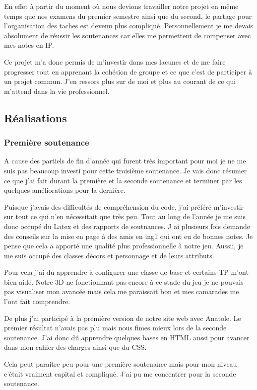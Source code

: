 \documentclass[12pt]{article}
\begin{document}
En effet à partir du moment où nous devions travailler notre projet en même  temps que nos examens du premier semestre ainsi que du second, le partage pour l’organisation des taches est devenu plus compliqué. Personnellement je me devais absolument de réussir les soutenances car elles me permettent de compenser avec mes notes en IP.

Ce projet m’a donc permis de m’investir dans mes lacunes et de me faire progresser tout en apprenant la cohésion de groupe et ce que c’est de participer à un projet commun. J’en ressors plus sur de moi et plus au courant de ce qui m’attend dans la vie professionnel.

\newpage
\subsection{Réalisations}
\subsubsection{Première soutenance}

A cause des partiels de fin d’année qui furent très important pour moi je ne me suis pas beaucoup investi pour cette troisième soutenance. Je vais donc résumer ce que j’ai fait durant la première et la seconde soutenance et terminer par les quelques améliorations pour la dernière.

Puisque j’avais des difficultés de compréhension du code, j’ai préféré m’investir sur tout ce qui n’en nécessitait que très peu. Tout au long de l'année je me suis donc occupé du Latex et des rapports de soutnances. J ai plusieurs fois demande des conseils sur la mise en page à des amis en ing1 qui ont eu de bonnes notes. Je pense que cela a apporté une qualité plus professionnelle à notre jeu. Aussii, je me suis occupé des classes décors et personnage et de leurs attributs.

 Pour cela j'ai du apprendre à configurer une classe de base et certains TP m'ont bien aidé. Notre 3D ne fonctionnant pas encore à ce stade du jeu je ne pouvais pas visualiser mon avancée mais cela me paraissait bon et mes camarades me l’ont fait comprendre.

De plus j’ai participé à la première version de notre site web avec Anatole. Le premier résultat n'avais pas plu mais nous fimes mieux lors de la seconde soutenance. J’ai donc dû apprendre quelques bases en HTML aussi pour avancer dans mon cahier des charges ainsi que du CSS.

Cela peut paraitre peu pour une première soutenance mais pour mon niveau c’était vraiment capital et compliqué. J’ai pu me concentrer pour la seconde soutenance.
\end{document}
